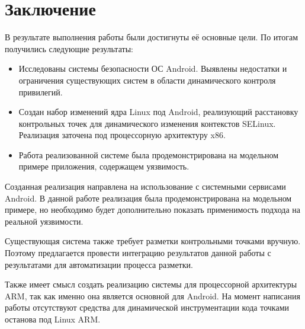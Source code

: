 \newpage
\section{Заключение}

В результате выполнения работы были достигнуты её основные цели. По
итогам получились следующие результаты:

\begin{itemize}

    \item Исследованы системы безопасности ОС Android. Выявлены
        недостатки и ограничения существующих систем в области
        динамического контроля привилегий.

    \item Создан набор изменений ядра Linux под Android, реализующий
        расстановку контрольных точек для динамического изменения
        контекстов SELinux. Реализация заточена под процессорную
        архитектуру x86.

    \item Работа реализованной системе была продемонстрирована на
        модельном примере приложения, содержащем уязвимость.

\end{itemize}

Созданная реализация направлена на использование с системными сервисами
Android. В данной работе реализация была продемонстрирована на модельном
примере, но необходимо будет дополнительно показать применимость подхода
на реальной уязвимости. 

Существующая система также требует разметки контрольными точками
вручную. Поэтому предлагается провести интеграцию результатов данной
работы с результатами \cite{mso} для автоматизации процесса разметки.

Также имеет смысл создать реализацию системы для процессорной
архитектуры ARM, так как именно она является основной для Android. На
момент написания работы отсутствуют средства для динамической
инструментации кода точками останова под Linux ARM.

\newpage

